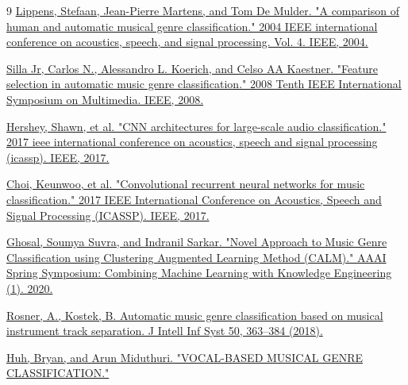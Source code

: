 \begin{thebibliography}{9}
    \href{https://d1wqtxts1xzle7.cloudfront.net/39743177/A_Comparison_of_Human_and_Automatic_Musi20151106-18003-18sog0k.pdf?1446804025=&response-content-disposition=inline%3B+filename%3DA_comparison_of_human_and_automatic_musi.pdf&Expires=1624178685&Signature=cPGccL8b4jsDu1DcOIpqLb8Xq3V4Fn3-sNPUJ6q-hn4jMb0dwljFf07U8tHiZ1Ap4biZcga1Qz4-mEfEQrk02fd2eBlFKRrLLMMTE0jg6bMolwt~geiH9G5hfwRFID0WobVYcviVSePWpgYo1ZP~rUoxhrzG5Xxcsh4rt8GezPN57dtyRa25gXed4VQv2bvmE~gclTftb0DKiVfGMs9abg0gZt6pzc90lrCSz4qaSoAHCIocB8VHYocdGkOSlCG8SSKEzGvILlKVEN0Rju8A1MshxPOV4F7cqG1Fhew3HysMmOg1dyZ8IrZgzaC2qgCZfY8eWDgPuhnUE5o6EuXXLQ__&Key-Pair-Id=APKAJLOHF5GGSLRBV4ZA}{Lippens, Stefaan, Jean-Pierre Martens, and Tom De Mulder. "A comparison of human and automatic musical genre classification." 2004 IEEE international conference on acoustics, speech, and signal processing. Vol. 4. IEEE, 2004.}
    
    \href{https://kar.kent.ac.uk/24091/1/FeatureSilla.pdf}{Silla Jr, Carlos N., Alessandro L. Koerich, and Celso AA Kaestner. "Feature selection in automatic music genre classification." 2008 Tenth IEEE International Symposium on Multimedia. IEEE, 2008.}
    
    \href{https://arxiv.org/pdf/1609.09430.pdf}{Hershey, Shawn, et al. "CNN architectures for large-scale audio classification." 2017 ieee international conference on acoustics, speech and signal processing (icassp). IEEE, 2017.}

    \href{https://arxiv.org/pdf/1609.04243.pdf}{Choi, Keunwoo, et al. "Convolutional recurrent neural networks for music classification." 2017 IEEE International Conference on Acoustics, Speech and Signal Processing (ICASSP). IEEE, 2017.}

    \href{http://ceur-ws.org/Vol-2600/paper18.pdf}{Ghosal, Soumya Suvra, and Indranil Sarkar. "Novel Approach to Music Genre Classification using Clustering Augmented Learning Method (CALM)." AAAI Spring Symposium: Combining Machine Learning with Knowledge Engineering (1). 2020.}

    \href{https://link.springer.com/article/10.1007/s10844-017-0464-5}{Rosner, A., Kostek, B. Automatic music genre classification based on musical instrument track separation. J Intell Inf Syst 50, 363–384 (2018).}

    \href{http://cs229.stanford.edu/proj2010/HuhMiduthuri-VocalBasedMusicalGenreClassification.pdf}{Huh, Bryan, and Arun Miduthuri. "VOCAL-BASED MUSICAL GENRE CLASSIFICATION."}


\end{thebibliography}
